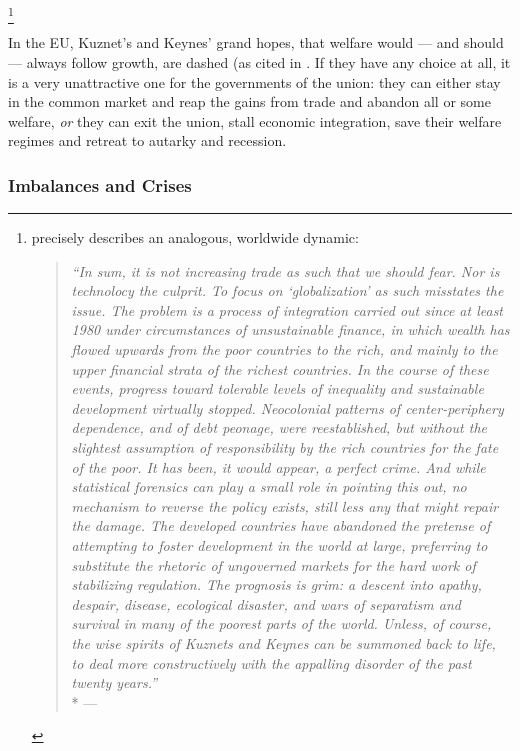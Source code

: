 \footnote{
	\citeauthor[25]{Galbraith2002a} precisely describes an analogous, worldwide dynamic:
	\begin{quote}
		\emph{``In sum, it is not increasing trade \emph{as such} that we should fear.
		Nor is technolocy the culprit.
		To focus on `globalization' as such misstates the issue.
		The problem is a process of integration carried out since at least 1980 under circumstances of unsustainable finance, in which wealth has flowed upwards from the poor countries to the rich, and mainly to the upper financial strata of the richest countries.
		In the course of these events, progress toward tolerable levels of inequality and sustainable development virtually stopped.
		Neocolonial patterns of center-periphery dependence, and of debt peonage, were reestablished, but without the slightest assumption of responsibility by the rich countries for the fate of the poor.
		It has been, it would appear, a perfect crime.
		And while statistical forensics can play a small role in pointing this out, no mechanism to reverse the policy exists, still less any that might repair the damage.
		The developed countries have abandoned the pretense of attempting to foster development in the world at large, preferring to substitute the rhetoric of ungoverned markets for the hard work of stabilizing regulation.
		The prognosis is grim:
		a descent into apathy, despair, disease, ecological disaster, and wars of separatism and survival in many of the poorest parts of the world.
		Unless, of course, the wise spirits of Kuznets and Keynes can be summoned back to life, to deal more constructively with the appalling disorder of the past twenty years.''}\\*
		--- \cite[25]{Galbraith2002a}
	\end{quote}
}

In the \gls{EU}, Kuznet's and Keynes' grand hopes, that welfare would --- and should --- always follow growth, are dashed (as cited in \cite[22]{Galbraith2002a}.
If they have any choice at all, it is a very unattractive one for the governments of the union:
they can either stay in the common market and reap the gains from trade and abandon all or some welfare, \emph{or} they can exit the union, stall economic integration, save their welfare regimes and retreat to autarky and recession.

\subsubsection{Imbalances and Crises} \label{sec:imbalances}

